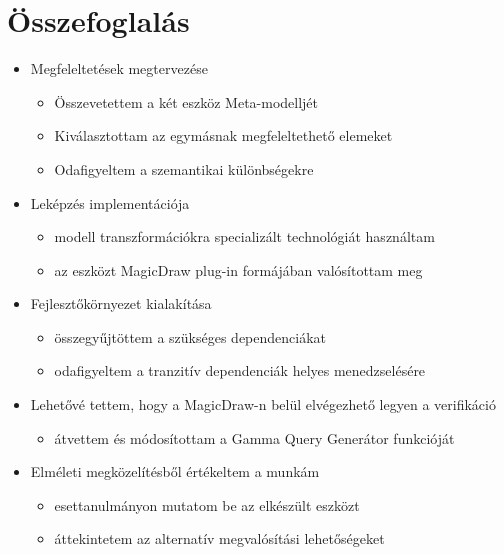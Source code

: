 \chapter{Összefoglalás}
\label{chap:osszefoglalas}


\begin{itemize}
	\item Megfeleltetések megtervezése
	\begin{itemize}
		\item Összevetettem a két eszköz Meta-modelljét
		\item Kiválasztottam az egymásnak megfeleltethető elemeket
		\item Odafigyeltem a szemantikai különbségekre
	\end{itemize}
	\item Leképzés implementációja
		\begin{itemize}
		\item modell transzformációkra specializált technológiát használtam
		\item az eszközt MagicDraw plug-in formájában valósítottam meg
	\end{itemize}
	\item Fejlesztőkörnyezet kialakítása
		\begin{itemize}
			\item összegyűjtöttem a szükséges dependenciákat
			\item odafigyeltem a tranzitív dependenciák helyes menedzselésére
		\end{itemize}
	\item Lehetővé tettem, hogy a MagicDraw-n belül elvégezhető legyen a verifikáció
			\begin{itemize}
			\item átvettem és módosítottam a Gamma Query Generátor funkcióját
		\end{itemize}

	\item Elméleti megközelítésből értékeltem a munkám
		\begin{itemize}
			\item esettanulmányon mutatom be az elkészült eszközt
			\item áttekintetem az alternatív megvalósítási lehetőségeket
		\end{itemize}
	
\end{itemize}

